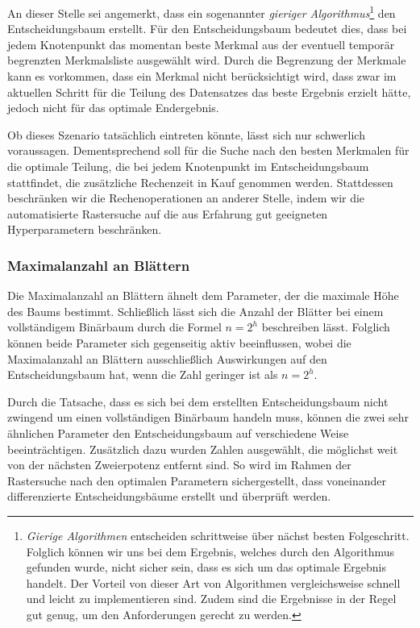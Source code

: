 \documentclass[12pt, a4paper]{article}
\begin{document}
An dieser Stelle sei angemerkt, dass ein sogenannter \textit{gieriger Algorithmus}\footnote{\textit{Gierige Algorithmen} entscheiden schrittweise über nächst besten Folgeschritt. Folglich können wir uns bei dem Ergebnis, welches durch den Algorithmus gefunden wurde, nicht sicher sein, dass es sich um das optimale Ergebnis handelt. Der Vorteil von dieser Art von Algorithmen vergleichsweise schnell und leicht zu implementieren sind. Zudem sind die Ergebnisse in der Regel gut genug, um den Anforderungen gerecht zu werden.} den Entscheidungsbaum erstellt. Für den Entscheidungsbaum bedeutet dies, dass bei jedem Knotenpunkt das momentan beste Merkmal aus der eventuell temporär begrenzten Merkmalsliste ausgewählt wird. Durch die Begrenzung der Merkmale kann es vorkommen, dass ein Merkmal nicht berücksichtigt wird, dass zwar im aktuellen Schritt für die Teilung des Datensatzes das beste Ergebnis erzielt hätte, jedoch nicht für das optimale Endergebnis.

Ob dieses Szenario tatsächlich eintreten könnte, lässt sich nur schwerlich voraussagen. Dementsprechend soll für die Suche nach den besten Merkmalen für die optimale Teilung, die bei jedem Knotenpunkt im Entscheidungsbaum stattfindet, die zusätzliche Rechenzeit in Kauf genommen werden. Stattdessen beschränken wir die Rechenoperationen an anderer Stelle, indem wir die automatisierte Rastersuche auf die aus Erfahrung gut geeigneten Hyperparametern beschränken.

\subsubsection{Maximalanzahl an Blättern}

Die Maximalanzahl an Blättern ähnelt dem Parameter, der die maximale Höhe des Baums bestimmt. Schließlich lässt sich die Anzahl der Blätter bei einem vollständigem Binärbaum durch die Formel $n=2^h$ beschreiben lässt. Folglich können beide Parameter sich gegenseitig aktiv beeinflussen, wobei die Maximalanzahl an Blättern ausschließlich Auswirkungen auf den Entscheidungsbaum hat, wenn die Zahl geringer ist als $n=2^h$.

Durch die Tatsache, dass es sich bei dem erstellten Entscheidungsbaum nicht zwingend um einen vollständigen Binärbaum handeln muss, können die zwei sehr ähnlichen Parameter den Entscheidungsbaum auf verschiedene Weise beeinträchtigen.
Zusätzlich dazu wurden Zahlen ausgewählt, die möglichst weit von der nächsten Zweierpotenz entfernt sind. So wird im Rahmen der Rastersuche nach den optimalen Parametern sichergestellt, dass voneinander differenzierte Entscheidungsbäume erstellt und überprüft werden.
\end{document}
